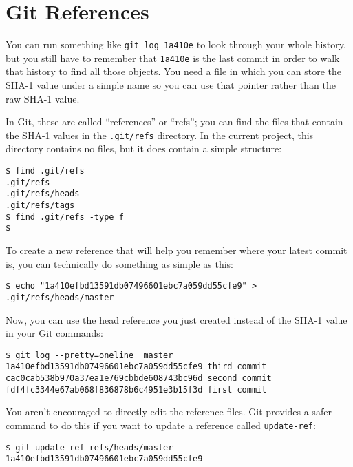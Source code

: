 \documentclass[a4paper]{book}
\begin{document}
\section{Git References}\label{git-references}

You can run something like \texttt{git log 1a410e} to look through your whole history, but you still have to remember that \texttt{1a410e} is the last commit in order to walk that history to find all those objects. You need a file in which you can store the SHA-1 value under a simple name so you can use that pointer rather than the raw SHA-1 value.

In Git, these are called “references” or “refs”; you can find the files that contain the SHA-1 values in the \texttt{.git/refs} directory. In the current project, this directory contains no files, but it does contain a simple structure:

\begin{shaded}\begin{verbatim}
$ find .git/refs
.git/refs
.git/refs/heads
.git/refs/tags
$ find .git/refs -type f
$
\end{verbatim}\end{shaded}

To create a new reference that will help you remember where your latest commit is, you can technically do something as simple as this:

\begin{shaded}\begin{verbatim}
$ echo "1a410efbd13591db07496601ebc7a059dd55cfe9" > .git/refs/heads/master
\end{verbatim}\end{shaded}

Now, you can use the head reference you just created instead of the SHA-1 value in your Git commands:

\begin{shaded}\begin{verbatim}
$ git log --pretty=oneline  master
1a410efbd13591db07496601ebc7a059dd55cfe9 third commit
cac0cab538b970a37ea1e769cbbde608743bc96d second commit
fdf4fc3344e67ab068f836878b6c4951e3b15f3d first commit
\end{verbatim}\end{shaded}

You aren't encouraged to directly edit the reference files. Git provides a safer command to do this if you want to update a reference called \texttt{update-ref}:

\begin{shaded}\begin{verbatim}
$ git update-ref refs/heads/master 1a410efbd13591db07496601ebc7a059dd55cfe9
\end{verbatim}\end{shaded}
\end{document}
